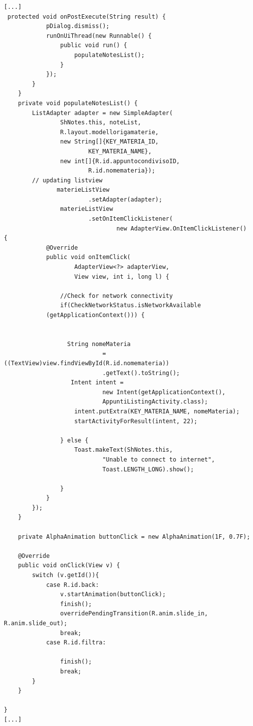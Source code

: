 \documentclass[a4paper, 50pt, twoside]{article}
\begin{document}
\begin{lstlisting}
[...]
 protected void onPostExecute(String result) {
            pDialog.dismiss();
            runOnUiThread(new Runnable() {
                public void run() {
                    populateNotesList();
                }
            });
        }
    }
    private void populateNotesList() {
        ListAdapter adapter = new SimpleAdapter(
                ShNotes.this, noteList,
                R.layout.modellorigamaterie,
                new String[]{KEY_MATERIA_ID,
                        KEY_MATERIA_NAME},
                new int[]{R.id.appuntocondivisoID,
                        R.id.nomemateria});
        // updating listview
               materieListView
                        .setAdapter(adapter);
                materieListView
                        .setOnItemClickListener(
                                new AdapterView.OnItemClickListener() {
            @Override
            public void onItemClick(
                    AdapterView<?> adapterView,
                    View view, int i, long l) {

                //Check for network connectivity
                if(CheckNetworkStatus.isNetworkAvailable
			(getApplicationContext())) {


                  String nomeMateria 
                            = ((TextView)view.findViewById(R.id.nomemateria))
                            .getText().toString();
                   Intent intent = 
                            new Intent(getApplicationContext(),
                            AppuntiListingActivity.class);
                    intent.putExtra(KEY_MATERIA_NAME, nomeMateria);
                    startActivityForResult(intent, 22);

                } else {
                    Toast.makeText(ShNotes.this,
                            "Unable to connect to internet",
                            Toast.LENGTH_LONG).show();

                }
            }
        });
    }

    private AlphaAnimation buttonClick = new AlphaAnimation(1F, 0.7F);

    @Override
    public void onClick(View v) {
        switch (v.getId()){
            case R.id.back:
                v.startAnimation(buttonClick);
                finish();
                overridePendingTransition(R.anim.slide_in, R.anim.slide_out);
                break;
            case R.id.filtra:

                finish();
                break;
        }
    }

}
[...]
\end{lstlisting}
\end{document}

